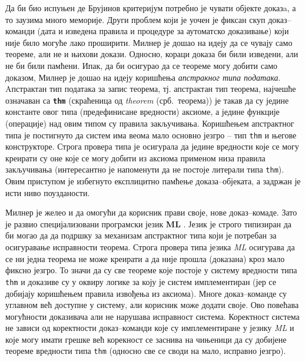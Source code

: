 Да би био испуњен де Брујинов критеријум потребно је чувати објекте
доказa, а то заузима много меморије.  Други проблем који је уочен је
фиксан скуп доказ--команди (дата и изведена правила и процедуре за
аутоматско доказивање) који није било могуће лако проширити. Милнер је
дошао на идеју да се чувају само теореме, али не и њихови
докази. Односно, кораци доказа би били изведени, али не би били
памћени. Ипак, да би осигурао да се теореме могу добити само доказом,
Милнер је дошао на идеју коришћења \emph{апстракног типа података}.
Aпстрактан тип података за запис теорема, тј. апстрактан тип теорема,
најчешће означаван са {\tt \textbf{thm}} (скраћеница од \emph{theorem}
(срб.~теорема)) је такав да су једине константе овог типа
(предефинисане вредности) аксиоме, а једине функције (операције) над
овим типом су правила закључивања. Коришћењем апстрактног типа је
постигнуто да систем има веома мало основно језгро -- тип {\tt thm} и
његове конструкторе. Строга провера типа је осигурала да једине
вредности које се могу креирати су оне које се могу добити из аксиома
применом низа правила закључивања (интересантно је напоменути да не
постоје литерали типа {\tt thm}). Овим приступом је избегнуто
експлицитно памћење доказа--објеката, а задржан је исти ниво
поузданости.

Милнер је желео и да омогући да корисник прави своје, нове
доказ--комаде. Зато је развио специјализовани програмски језик
\textbf{ML} \cite{standardML}. Језик је строго типизиран да би могао
да да подршку за механизам апстрактног типа који је потребан за
осигуравање исправности теорема. Строга провера типа језика \emph{ML}
осигурава да се ни једна теорема не може креирати а да није прошла
(доказана) кроз мало фиксно језгро. То значи да су све теореме које
постоје у систему вредности типа {\tt thm} и доказиве су у оквиру
логике за коју је систем имплементиран (јер се добијају коришћењем
правила извођења из аксиома). Многе доказ--команде су углавном већ
доступне у систему, али корисник може додати своје. Ово повећава
могућности доказивача али не нарушава исправност система. Коректност
система не зависи од коректности доказ--команди које су имплементиране
у језику \emph{ML} и које могу имати грешке већ корекност се заснива
на чињеници да су добијене теореме вредности типа {\tt thm} (односно
све се своди на мало, исправно језгро).

